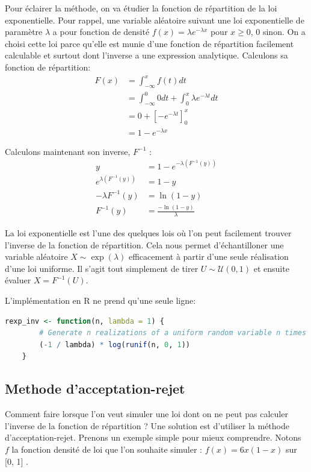 \documentclass[10pt]{article} %
\begin{document}
Pour éclairer la méthode, on va étudier la fonction de répartition de la loi exponentielle. Pour rappel, une variable aléatoire suivant une loi exponentielle de paramètre
$\lambda$ a pour fonction de densité $f(x) = \lambda e^{-\lambda x}$ pour $x \geq 0$, $0$ sinon. On a choisi cette loi parce qu'elle est munie d'une fonction de répartition facilement calculable
et surtout dont l'inverse a une expression analytique. Calculons sa fonction de répartition:
\begin{align*}
    F(x) &= \int_{-\infty}^xf(t)dt \\
    & = \int_{-\infty}^0 0 dt + \int_0^x \lambda e^{-\lambda t} dt \\
    &= 0 + \left[-e^{-\lambda t}\right]_0^x \\
    &= 1 - e^{-\lambda x}
\end{align*}

Calculons maintenant son inverse, $F^{-1}$ :
\begin{align*}
    y &= 1 - e^{-\lambda (F^{-1}(y))} \\
    e^{\lambda (F^{-1}(y))} &= 1 - y \\
    -\lambda F^{-1}(y) &= \ln(1 - y) \\
    F^{-1}(y) &= \frac{-\ln(1 - y)}{\lambda}
\end{align*}

La loi exponentielle est l'une des quelques lois où l'on peut facilement trouver l'inverse de la fonction de répartition. Cela nous permet
d'échantilloner une variable aléatoire $X \sim \exp(\lambda)$ efficacement à partir d'une seule réalisation d'une loi uniforme. Il s'agit tout
simplement de tirer $U \sim \mathcal{U}(0, 1)$ et ensuite évaluer $X = F^{-1}(U)$.

L'implémentation en R ne prend qu'une seule ligne:

\begin{lstlisting}[language=R]
    rexp_inv <- function(n, lambda = 1) {
        # Generate n realizations of a uniform random variable n times
        (-1 / lambda) * log(runif(n, 0, 1))
    }
\end{lstlisting}


\subsection{Methode d'acceptation-rejet}
Comment faire lorsque l'on veut simuler une loi dont on ne peut pas calculer l'inverse de la fonction de répartition ? Une solution est d'utiliser la méthode d'acceptation-rejet. Prenons un exemple simple pour mieux comprendre. Notons $f$ la fonction densité de loi que l'on souhaite simuler : $f(x) = 6x(1-x) $ sur [0, 1] .
\end{document}

